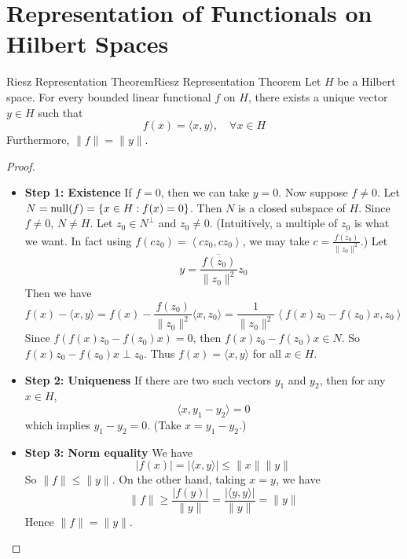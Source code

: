 \documentclass[../main.tex]{subfiles}
\begin{document}
\section{Representation of Functionals on Hilbert Spaces}
\begin{theorem}{Riesz Representation Theorem}{Riesz Representation Theorem}
	Let $H$ be a Hilbert space. For every bounded linear functional $f$ on $H$, there exists a unique vector $y\in H$ such that
	\begin{equation}
		f(x) = \langle x, y \rangle, \quad \forall x\in H
	\end{equation}
	Furthermore, $\|f\| = \|y\|$.
\end{theorem}
\begin{proof}
\begin{itemize}
	\item \textbf{Step 1: Existence} If $f=0$, then we can take $y=0$. Now suppose $f\neq 0$. Let $N = \operatorname{null}(f) = \{x\in H: f(x) = 0\}$. Then $N$ is a closed subspace of $H$. Since $f\neq 0$, $N \neq H$. Let $z_0\in N^\perp$ and $z_0 \neq 0$. (Intuitively, a multiple of $z_0$ is what we want. In fact using $f(cz_0) = \left<cz_0,cz_0\right>$, we may take $\displaystyle c = \frac{\overline{f(z_0)}}{\|z_0\|^2}$.) Let
		\begin{equation*}
			y = \frac{\overline{f(z_0)}}{\|z_0\|^2} z_0
		\end{equation*}
		Then we have
		\begin{equation*}
			f(x) - \langle x, y \rangle = f(x) - \frac{f(z_0)}{\|z_0\|^2} \langle x, z_0 \rangle = \frac{1}{\|z_0\|^2} \left< f(x) z_0 - f(z_0) x, z_0 \right>
		\end{equation*}
		Since $f(f(x) z_0 - f(z_0) x) = 0$, then $f(x) z_0 - f(z_0) x \in N$. So $f(x) z_0 - f(z_0) x \perp z_0$. Thus $f(x) = \langle x, y \rangle$ for all $x\in H$.
	\item \textbf{Step 2: Uniqueness} If there are two such vectors $y_1$ and $y_2$, then for any $x\in H$,
		\begin{equation*}
			\langle x, y_1 - y_2 \rangle = 0
		\end{equation*}
		which implies $y_1 - y_2 = 0$. (Take $x = y_1 - y_2$.)
	\item \textbf{Step 3: Norm equality} We have
		\begin{equation*}
			|f(x)| = |\langle x, y \rangle| \leq \|x\| \|y\|
		\end{equation*}
		So $\|f\| \leq \|y\|$. On the other hand, taking $x = y$, we have
		\begin{equation*}
			\|f\| \geq \frac{|f(y)|}{\|y\|} = \frac{|\langle y, y \rangle|}{\|y\|} = \|y\|
		\end{equation*}
		Hence $\|f\| = \|y\|$.
\end{itemize}
\end{proof}
\end{document}
